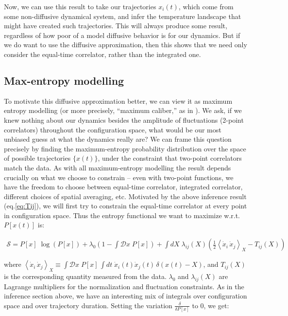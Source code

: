 \documentclass[reprint,prx]{revtex4-1}
\newcommand{\fd}[2]{\frac{\delta #1}{\delta #2}} %
\renewcommand{\=}[1]{\stackrel{#1}{=}} %
\renewcommand{\(}{\left (}
\renewcommand{\)}{\right  )}
\renewcommand{\[}{\left [}
\renewcommand{\]}{\right ]}
\newcommand{\<}{\left <}
\renewcommand{\>}{\right >}
\theoremstyle{definition}
\theoremstyle{remark}
\begin{document}
Now, we can use this result to take our trajectories $ x_i(t) $, which come from some non-diffusive dynamical system, and infer the temperature landscape that might have created such trajectories. This will always produce some result, regardless of how poor of a model diffusive behavior is for our dynamics. But if we do want to use the diffusive approximation, then this shows that we need only consider the equal-time correlator, rather than the integrated one. 

\subsection{Max-entropy modelling} \label{app:max-ent}

To motivate this diffusive approximation better, we can view it as maximum entropy modelling (or more precisely, ``maximum caliber,'' as in \cite{dill18max_caliber}). We ask, if we knew nothing about our dynamics besides the amplitude of fluctuations (2-point correlators) throughout the configuration space, what would be our most unbiased guess at what the dynamics really are? We can frame this question precisely by finding the maximum-entropy probability distribution over the space of possible trajectories $ \{x(t)\} $, under the constraint that two-point correlators match the data. As with all maximum-entropy modelling the result depends crucially on what we choose to constrain -- even with two-point functions, we have the freedom to choose between equal-time correlator, integrated correlator, different choices of spatial averaging, etc. Motivated by the above inference result (eq.\ref{eq:Tij}), we will first try to constrain the equal-time correlator at every point in configuration space. Thus the entropy functional we want to maximize w.r.t. $ P[x(t)] $ is:
\begin{widetext}
\begin{align*}
\mathcal{S} = P[x] \;\log\(P[x]\) + \lambda_0 \(1- \int \mathcal{D} x \;P[x]\) + 
\int dX \; \lambda_{ij}(X) \(\frac{1}{2}\< \dot{x}_i\,\dot{x}_j\> _X - T_{ij}(X)\)
\end{align*}
\end{widetext}
where $ \< \dot{x}_i\, \dot{x}_j\> _X \equiv \int \mathcal{D}x \; P[x] \,\int dt \; \dot{x}_i(t) \dot{x}_j(t) \,\delta(x(t) - X) $, and $ T_{ij}(X) $ is the corresponding quantity measured from the data. $ \lambda_0 $ and $ \lambda_{ij}(X) $ are Lagrange multipliers for the normalization and fluctuation constraints. As in the inference section above, we have an interesting mix of integrals over configuration space and over trajectory duration. Setting the variation $ \fd{\quad}{P[x]} $ to 0, we get:
\end{document}
